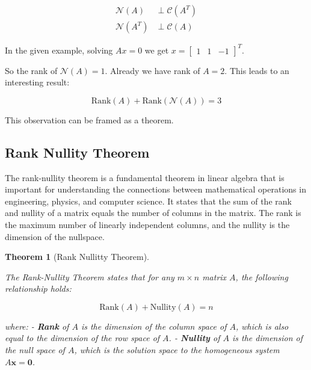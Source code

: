 \documentclass[
  letterpaper,
  DIV=11,
  numbers=noendperiod]{scrreprt}
\theoremstyle{plain}
\newtheorem{theorem}{Theorem}[chapter]
\theoremstyle{definition}
\theoremstyle{remark}
\begin{document}
\begin{tcolorbox}[enhanced jigsaw, leftrule=.75mm, bottomtitle=1mm, colback=white, toptitle=1mm, opacitybacktitle=0.6, toprule=.15mm, colbacktitle=quarto-callout-note-color!10!white, arc=.35mm, colframe=quarto-callout-note-color-frame, title=\textcolor{quarto-callout-note-color}{\faInfo}\hspace{0.5em}{Note}, titlerule=0mm, rightrule=.15mm, left=2mm, bottomrule=.15mm, breakable, coltitle=black, opacityback=0]

\begin{align*}
\mathcal{N}(A)&\perp \mathcal{C}(A^T)\\
\mathcal{N}(A^T)&\perp \mathcal{C}(A)
\end{align*}

\end{tcolorbox}

In the given example, solving \(Ax=0\) we get
\(x=\begin{bmatrix}1&1&-1\end{bmatrix}^T\).

So the rank of \(\mathcal{N}(A)=1\). Already we have rank of \(A=2\).
This leads to an interesting result:

\[\text{Rank}(A)+\text{Rank}(\mathcal{N}(A))=3\]

This observation can be framed as a theorem.

\subsection*{Rank Nullity Theorem}\label{rank-nullity-theorem}

The rank-nullity theorem is a fundamental theorem in linear algebra that
is important for understanding the connections between mathematical
operations in engineering, physics, and computer science. It states that
the sum of the rank and nullity of a matrix equals the number of columns
in the matrix. The rank is the maximum number of linearly independent
columns, and the nullity is the dimension of the nullspace.

\begin{theorem}[Rank Nullitty
Theorem]\protect\hypertarget{thm-RNT}{}\label{thm-RNT}

The Rank-Nullity Theorem states that for any \(m \times n\) matrix
\(A\), the following relationship holds:

\[
\text{Rank}(A) + \text{Nullity}(A) = n
\]

where: - \textbf{Rank} of \(A\) is the dimension of the column space of
\(A\), which is also equal to the dimension of the row space of \(A\). -
\textbf{Nullity} of \(A\) is the dimension of the null space of \(A\),
which is the solution space to the homogeneous system
\(A \mathbf{x} = \mathbf{0}\).

\end{theorem}
\end{document}
